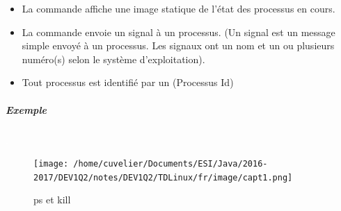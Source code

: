 \documentclass[11pt,a4paper]{article}
\begin{document}
			\begin{boxedminipage}[h]{\linewidth}
		
					\begin{itemize}
				
			\item 
						La commande \verb@ps@
						affiche une image statique de l'\'etat des processus en cours.
					
			\item 
						La commande \verb@kill@
						envoie un signal \`a un processus.
						(Un signal est un message simple envoy\'e \`a un processus.
						Les signaux ont un nom et un ou plusieurs num\'ero(s)
						selon le syst\`eme d'exploitation).
					
			\item 
						Tout processus est identifi\'e par un
						\verb@PID@ (Processus Id)
					\end{itemize}
				
			\end{boxedminipage}

			
		\subparagraph{Exemple} 
		
					\textcolor{white}{.} \par
				
            \par
        \begin{figure}[hbt]
				    \begin{center}
					\texttt{[image: /home/cuvelier/Documents/ESI/Java/2016-2017/DEV1Q2/notes/DEV1Q2/TDLinux/fr/image/capt1.png]}
						\end{center}
                
                    \caption[ps et kill]{ps et kill}
                \end{figure}
                    
\end{document}
